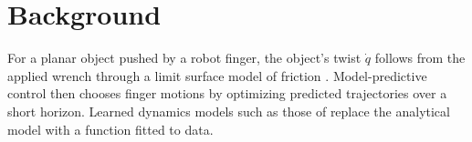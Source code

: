 \chapter{Background}
\label{ch:background}

For a planar object pushed by a robot finger, the object's twist $\dot{q}$ follows from the
applied wrench through a limit surface model of friction \citep{goyal1991}. Model-predictive
control then chooses finger motions by optimizing predicted trajectories over a short horizon.
Learned dynamics models such as those of \citet{deisenroth2011} replace the analytical model
with a function fitted to data.

